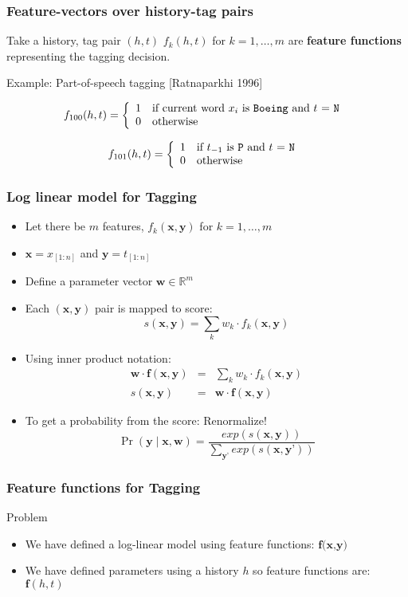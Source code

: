\newcommand{\featurefunction}[3]{
\[ 
f_{#1}(h,t) = \left\{
\begin{array}{ll}
1 & \textrm{if #2 and $t$ = #3 } \\
0 & \textrm{otherwise}
\end{array}
\right.
\]
}

\begin{frame}
\frametitle{Feature-vectors over history-tag pairs}
\begin{block}{Take a history, tag pair $(h,t)$}
$f_k(h, t)$ for $k = 1, \ldots, m$ are \textbf{feature functions} representing the tagging decision.
\end{block}
\pause
\begin{block}{Example: Part-of-speech tagging [Ratnaparkhi 1996]}
\centering
\featurefunction{100}{current word $x_i$ is \texttt{Boeing}}{\texttt{N}}
\featurefunction{101}{$t_{-1}$ is \texttt{P}}{\texttt{N}}
\end{block}
\end{frame}

\begin{frame}
\frametitle{Log linear model for Tagging}
\begin{itemize}[<+->]
\item Let there be $m$ features, $f_k(\textbf{x}, \textbf{y})$ for $k = 1, \ldots, m$
\item $\textbf{x} = x_{[1:n]}$ and $\textbf{y} = t_{[1:n]}$
\item Define a parameter vector $\textbf{w} \in \mathbb{R}^m$
\item Each $(\textbf{x}, \textbf{y})$ pair is mapped to score:
\[ s(\textbf{x}, \textbf{y}) = \sum_k w_k \cdot f_k(\textbf{x}, \textbf{y}) \]
\item Using inner product notation:
\begin{eqnarray*}
\textbf{w} \cdot \textbf{f}(\textbf{x}, \textbf{y}) & = & \sum_k w_k \cdot f_k(\textbf{x}, \textbf{y}) \\
s(\textbf{x}, \textbf{y}) & = & \textbf{w} \cdot \textbf{f}(\textbf{x}, \textbf{y}) 
\end{eqnarray*}
\item To get a probability from the score: Renormalize! 
\[ \Pr(\textbf{y} \mid \textbf{x}, \textbf{w}) = \frac{exp\left(s(\textbf{x}, \textbf{y})\right)}{\sum_{\textbf{y'}} exp\left(s(\textbf{x}, \textbf{y'})\right)} \]
\end{itemize}
\end{frame}

\begin{frame}
\frametitle{Feature functions for Tagging}
\begin{block}{Problem}
\begin{itemize}
\item We have defined a log-linear model using feature functions: $\textbf{f(x,y)}$ 
\item We have defined parameters using a history $h$ so feature functions are: $\textbf{f}(h, t)$
\end{itemize}
\end{block}
\end{frame}

